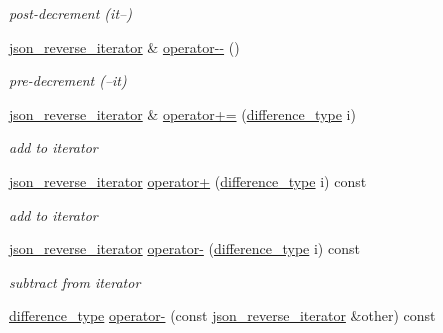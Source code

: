 \begin{DoxyCompactItemize}
\begin{DoxyCompactList}\small\item\em post-\/decrement (it--) \end{DoxyCompactList}\item 
\hyperlink{classnlohmann_1_1basic__json_1_1json__reverse__iterator}{json\+\_\+reverse\+\_\+iterator} \& \hyperlink{classnlohmann_1_1basic__json_1_1json__reverse__iterator_a563a7bd281e9919798d18396107fb05c}{operator-\/-\/} ()
\begin{DoxyCompactList}\small\item\em pre-\/decrement (--it) \end{DoxyCompactList}\item 
\hyperlink{classnlohmann_1_1basic__json_1_1json__reverse__iterator}{json\+\_\+reverse\+\_\+iterator} \& \hyperlink{classnlohmann_1_1basic__json_1_1json__reverse__iterator_a9accc9dd9f9033f50c0ab6bcf337ffe0}{operator+=} (\hyperlink{classnlohmann_1_1basic__json_aec316934a555dd1acdd3600e5d4a4cdf}{difference\+\_\+type} i)
\begin{DoxyCompactList}\small\item\em add to iterator \end{DoxyCompactList}\item 
\hyperlink{classnlohmann_1_1basic__json_1_1json__reverse__iterator}{json\+\_\+reverse\+\_\+iterator} \hyperlink{classnlohmann_1_1basic__json_1_1json__reverse__iterator_a99ee137dab7e5c948457f6a5321b54b1}{operator+} (\hyperlink{classnlohmann_1_1basic__json_aec316934a555dd1acdd3600e5d4a4cdf}{difference\+\_\+type} i) const 
\begin{DoxyCompactList}\small\item\em add to iterator \end{DoxyCompactList}\item 
\hyperlink{classnlohmann_1_1basic__json_1_1json__reverse__iterator}{json\+\_\+reverse\+\_\+iterator} \hyperlink{classnlohmann_1_1basic__json_1_1json__reverse__iterator_ac2634bee082633671125e909dffad40a}{operator-\/} (\hyperlink{classnlohmann_1_1basic__json_aec316934a555dd1acdd3600e5d4a4cdf}{difference\+\_\+type} i) const 
\begin{DoxyCompactList}\small\item\em subtract from iterator \end{DoxyCompactList}\item 
\hyperlink{classnlohmann_1_1basic__json_aec316934a555dd1acdd3600e5d4a4cdf}{difference\+\_\+type} \hyperlink{classnlohmann_1_1basic__json_1_1json__reverse__iterator_a115fae3dd8ae02669fedae0545ce1cbc}{operator-\/} (const \hyperlink{classnlohmann_1_1basic__json_1_1json__reverse__iterator}{json\+\_\+reverse\+\_\+iterator} \&other) const 

\end{DoxyCompactItemize}
